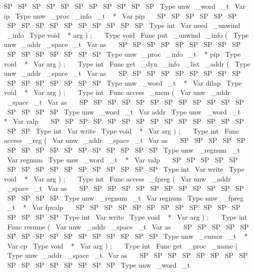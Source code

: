 SP
\
SP
\
SP
\
SP
\
SP
\
SP
\
SP
\
SP
\
SP
\
SP
\
SP
\
Type
{
unw
\
_word
\
_t
}
\
Var
{
ip
}
\
Type
{
unw
\
_proc
\
_info
\
_t
~
*
}
\
Var
{
pip
}
\
\
\
SP
\
SP
\
SP
\
SP
\
SP
\
SP
\
SP
\
SP
\
SP
\
SP
\
SP
\
SP
\
SP
\
SP
\
SP
\
SP
\
Type
{
int
}
\
Var
{
need
\
_unwind
\
_info
}
\
Type
{
void
~
*
}
arg
)
;
\
\
\
Type
{
void
}
\
Func
{
put
\
_unwind
\
_info
}
(
\
Type
{
unw
\
_addr
\
_space
\
_t
}
\
Var
{
as
}
\
\
\
SP
\
SP
\
SP
\
SP
\
SP
\
SP
\
SP
\
SP
\
SP
\
SP
\
SP
\
SP
\
SP
\
SP
\
SP
\
SP
\
Type
{
unw
\
_proc
\
_info
\
_t
~
*
}
pip
\
Type
{
void
~
*
}
\
Var
{
arg
}
)
;
\
\
\
Type
{
int
}
\
Func
{
get
\
_dyn
\
_info
\
_list
\
_addr
}
(
\
Type
{
unw
\
_addr
\
_space
\
_t
}
\
Var
{
as
}
\
\
\
SP
\
SP
\
SP
\
SP
\
SP
\
SP
\
SP
\
SP
\
SP
\
SP
\
SP
\
SP
\
SP
\
SP
\
SP
\
SP
\
Type
{
unw
\
_word
\
_t
~
*
}
\
Var
{
dilap
}
\
Type
{
void
~
*
}
\
Var
{
arg
}
)
;
\
\
\
Type
{
int
}
\
Func
{
access
\
_mem
}
(
\
Var
{
unw
\
_addr
\
_space
\
_t
}
\
Var
{
as
}
\
\
\
SP
\
SP
\
SP
\
SP
\
SP
\
SP
\
SP
\
SP
\
SP
\
SP
\
SP
\
SP
\
SP
\
SP
\
SP
\
SP
\
Type
{
unw
\
_word
\
_t
}
\
Var
{
addr
}
\
Type
{
unw
\
_word
\
_t
~
*
}
\
Var
{
valp
}
\
\
\
SP
\
SP
\
SP
\
SP
\
SP
\
SP
\
SP
\
SP
\
SP
\
SP
\
SP
\
SP
\
SP
\
SP
\
SP
\
SP
\
Type
{
int
}
\
Var
{
write
}
\
Type
{
void
~
*
}
\
Var
{
arg
}
)
;
\
\
\
Type
{
int
}
\
Func
{
access
\
_reg
}
(
\
Var
{
unw
\
_addr
\
_space
\
_t
}
\
Var
{
as
}
\
\
\
SP
\
SP
\
SP
\
SP
\
SP
\
SP
\
SP
\
SP
\
SP
\
SP
\
SP
\
SP
\
SP
\
SP
\
SP
\
SP
\
Type
{
unw
\
_regnum
\
_t
}
\
Var
{
regnum
}
\
Type
{
unw
\
_word
\
_t
~
*
}
\
Var
{
valp
}
\
\
\
SP
\
SP
\
SP
\
SP
\
SP
\
SP
\
SP
\
SP
\
SP
\
SP
\
SP
\
SP
\
SP
\
SP
\
SP
\
SP
\
Type
{
int
}
\
Var
{
write
}
\
Type
{
void
~
*
}
\
Var
{
arg
}
)
;
\
\
\
Type
{
int
}
\
Func
{
access
\
_fpreg
}
(
\
Var
{
unw
\
_addr
\
_space
\
_t
}
\
Var
{
as
}
\
\
\
SP
\
SP
\
SP
\
SP
\
SP
\
SP
\
SP
\
SP
\
SP
\
SP
\
SP
\
SP
\
SP
\
SP
\
SP
\
SP
\
Type
{
unw
\
_regnum
\
_t
}
\
Var
{
regnum
}
\
Type
{
unw
\
_fpreg
\
_t
~
*
}
\
Var
{
fpvalp
}
\
\
\
SP
\
SP
\
SP
\
SP
\
SP
\
SP
\
SP
\
SP
\
SP
\
SP
\
SP
\
SP
\
SP
\
SP
\
SP
\
SP
\
Type
{
int
}
\
Var
{
write
}
\
Type
{
void
~
*
}
\
Var
{
arg
}
)
;
\
\
\
Type
{
int
}
\
Func
{
resume
}
(
\
Var
{
unw
\
_addr
\
_space
\
_t
}
\
Var
{
as
}
\
\
\
SP
\
SP
\
SP
\
SP
\
SP
\
SP
\
SP
\
SP
\
SP
\
SP
\
SP
\
SP
\
SP
\
SP
\
SP
\
SP
\
Type
{
unw
\
_cursor
\
_t
~
*
}
\
Var
{
cp
}
\
Type
{
void
~
*
}
\
Var
{
arg
}
)
;
\
\
\
Type
{
int
}
\
Func
{
get
\
_proc
\
_name
}
(
\
Type
{
unw
\
_addr
\
_space
\
_t
}
\
Var
{
as
}
\
\
\
SP
\
SP
\
SP
\
SP
\
SP
\
SP
\
SP
\
SP
\
SP
\
SP
\
SP
\
SP
\
SP
\
SP
\
SP
\
SP
\
Type
{
unw
\
_word
\
_t
}
